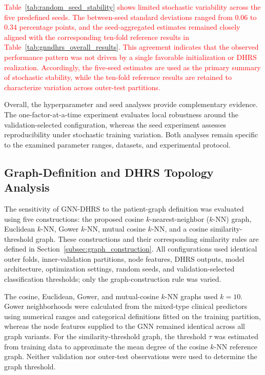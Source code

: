 \documentclass[pdflatex,sn-mathphys-num]{sn-jnl}%
\theoremstyle{thmstyleone}%
\theoremstyle{thmstyletwo}%
\theoremstyle{thmstylethree}%
\begin{document}
\textcolor{red}{
Table~\ref{tab:random_seed_stability} shows limited stochastic variability
across the five predefined seeds. The between-seed standard deviations ranged
from \(0.06\) to \(0.34\) percentage points, and the seed-aggregated estimates
remained closely aligned with the corresponding ten-fold reference results in
Table~\ref{tab:gnndhrs_overall_results}. This agreement indicates that the
observed performance pattern was not driven by a single favorable
initialization or DHRS realization. Accordingly, the five-seed estimates are
used as the primary summary of stochastic stability, while the ten-fold
reference results are retained to characterize variation across outer-test
partitions.
}

 {
Overall, the hyperparameter and seed analyses provide complementary evidence.
The one-factor-at-a-time experiment evaluates local robustness around the
validation-selected configuration, whereas the seed experiment assesses
reproducibility under stochastic training variation. Both analyses remain
specific to the examined parameter ranges, datasets, and experimental
protocol.
}
\subsection{Graph-Definition and DHRS Topology Analysis}
\label{subsec:graph_definition_comparison}

 {
The sensitivity of GNN-DHRS to the patient-graph definition was evaluated
using five constructions: the proposed cosine \(k\)-nearest-neighbor
(\(k\)-NN) graph, Euclidean \(k\)-NN, Gower \(k\)-NN, mutual cosine
\(k\)-NN, and a cosine similarity-threshold graph. These constructions and
their corresponding similarity rules are defined in
Section~\ref{subsec:graph_construction}. All configurations used identical
outer folds, inner-validation partitions, node features, DHRS outputs, model
architecture, optimization settings, random seeds, and validation-selected
classification thresholds; only the graph-construction rule was varied.
}

 {
The cosine, Euclidean, Gower, and mutual-cosine \(k\)-NN graphs used
\(k=10\). Gower neighborhoods were calculated from the mixed-type clinical
predictors using numerical ranges and categorical definitions fitted on the
training partition, whereas the node features supplied to the GNN remained
identical across all graph variants. For the similarity-threshold graph, the
threshold \(\tau\) was estimated from training data to approximate the mean
degree of the cosine \(k\)-NN reference graph. Neither validation nor
outer-test observations were used to determine the graph threshold.
}
\end{document}
